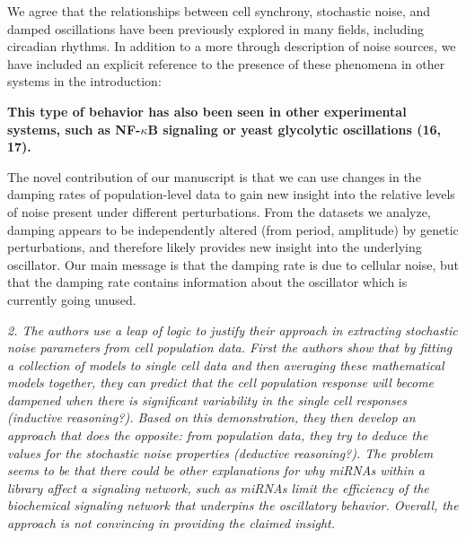 \documentclass[11pt, letterpaper]{article}
\newenvironment{reviewer}{\itshape\color{gray}}{}
\newenvironment{manuscript}[1]{\begin{center}\begin{tcolorbox}[colback=green!5!white,colframe=green!75!black,width=\textwidth,title={#1},breakable,fonttitle=\bfseries]}{\end{tcolorbox}\end{center}}
\begin{document}
We agree that the relationships between cell synchrony, stochastic noise, and damped oscillations have been previously explored in many fields, including circadian rhythms. In addition to a more through description of noise sources, we have included an explicit reference to the presence of these phenomena in other systems in the introduction:

\begin{manuscript}{Page 3}
  {\bfseries This type of behavior has also been seen in
  other experimental systems, such as NF-$\kappa$B signaling or yeast glycolytic oscillations (16, 17).}
\end{manuscript}

The novel contribution of our manuscript is that we can use changes in the damping rates of population-level data to gain new insight into the relative levels of noise present under different perturbations.
From the datasets we analyze, damping appears to be independently altered (from period, amplitude) by genetic perturbations, and therefore likely provides new insight into the underlying oscillator.
Our main message is that the damping rate is due to cellular noise, but that the damping rate contains information about the oscillator which is currently going unused.

\begin{reviewer}
2. The authors use a leap of logic to justify their approach in extracting stochastic noise parameters from cell population data. First the authors show that by fitting a collection of models to single cell data and then averaging these mathematical models together, they can predict that the cell population response will become dampened when there is significant variability in the single cell responses (inductive reasoning?). Based on this demonstration, they then develop an approach that does the opposite: from population data, they try to deduce the values for the stochastic noise properties (deductive reasoning?). The problem seems to be that there could be other explanations for why miRNAs within a library affect a signaling network, such as miRNAs limit the efficiency of the biochemical signaling network that underpins the oscillatory behavior. Overall, the approach is not convincing in providing the claimed insight. 
\end{reviewer}
\end{document}
